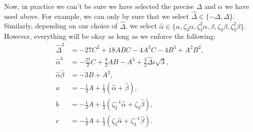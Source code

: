 Now, in practice we can't be sure we have selected the precise \(\Delta\) and \(\alpha\) we have used above.
For example, we can only by sure that we select \(\hat\Delta \in \{-\Delta, \Delta\}\). Similarly, depending
on our choice of \(\hat \Delta\), we select \(\hat \alpha \in \{\alpha, \zeta_3\alpha, \zeta_3^2\alpha,
\beta, \zeta_3\beta, \zeta_3^2\beta\}\). However, everything will be okay as long as we enforce the
following:
\begin{align}
\hat\Delta^2 & = -27 C^2 + 18 ABC
    - 4 A^3C - 4 B^3 + A^2 B^2, \\
\hat\alpha^3 & = -\frac{27}{2} C + \frac{9}{2} AB - A^3
    + \frac{3}{2} \hat\Delta i\sqrt{3}, \\
\hat\alpha \hat\beta & = -3B + A^2, \\
a & = -\frac{1}{3} A + \frac{1}{3}(\hat\alpha + \hat\beta), \\
b & = -\frac{1}{3} A + \frac{1}{3}(\zeta_3^{-1} \hat\alpha + \zeta_3 \hat\beta), \\
c & = -\frac{1}{3} A + \frac{1}{3}(\zeta_3 \hat\alpha + \zeta_3^{-1} \hat\beta). 
\end{align}

